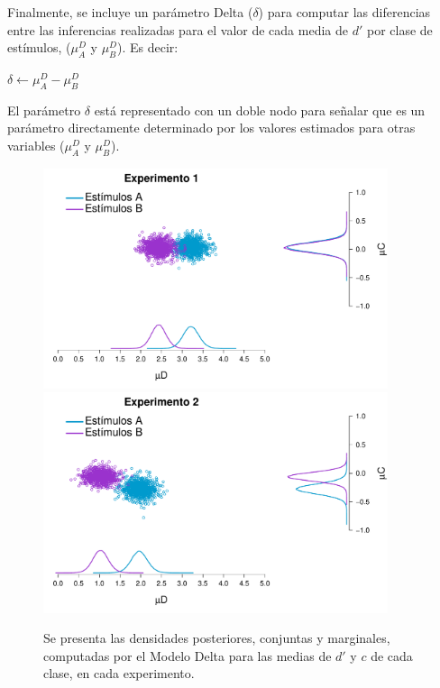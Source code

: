 \begin{itemize}
Finalmente, se incluye un parámetro Delta ($\delta$) para computar las diferencias entre las inferencias realizadas para el valor de cada media de $d'$ por clase de estímulos, ($\mu^D_{A}$ y $\mu^D_{B}$). Es decir:

\begin{center}
$\delta \gets \mu^D_{A}-\mu^D_{B}$\\
\end{center}

El parámetro $\delta$ está representado con un doble nodo para señalar que es un parámetro directamente determinado por los valores estimados para otras variables ($\mu^D_{A}$ y $\mu^D_{B}$).\\
\end{itemize} 

\begin{figure}[p]
\centering
\includegraphics[width=0.9\textwidth]{Figures/MDelta_Joint_E1}\\
\includegraphics[width=0.9\textwidth]{Figures/MDelta_Joint_E2}\\
\decoRule
\caption[Modelo Delta: Distribuciones posteriores marginales y conjuntas para $\mu d'$ y $\mu c$ por cada clase de estímulo]{Se presenta las densidades posteriores, conjuntas y marginales, computadas por el Modelo Delta para las medias de $d'$ y $c$ de cada clase, en cada experimento.}
\label{fig:Delta_Joints}
\end{figure}

